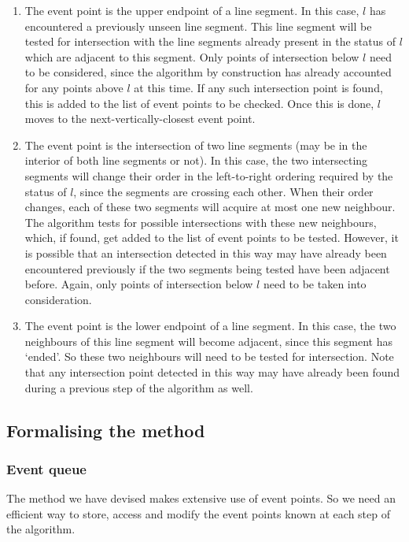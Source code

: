 \documentclass{article}
\begin{document}
\begin{enumerate}
    \item The event point is the upper endpoint of a line segment. In this case, $l$ has encountered a previously unseen line segment. This line segment will be tested for intersection with the line segments already present in the status of $l$ which are adjacent to this segment. Only points of intersection below $l$ need to be considered, since the algorithm by construction has already accounted for any points above $l$ at this time. If any such intersection point is found, this is added to the list of event points to be checked. Once this is done, $l$ moves to the next-vertically-closest event point.
    
    \item The event point is the intersection of two line segments (may be in the interior of both line segments or not). In this case, the two intersecting segments will change their order in the left-to-right ordering required by the status of $l$, since the segments are crossing each other. When their order changes, each of these two segments will acquire at most one new neighbour. The algorithm tests for possible intersections with these new neighbours, which, if found, get added to the list of event points to be tested. However, it is possible that an intersection detected in this way may have already been encountered previously if the two segments being tested have been adjacent before. Again, only points of intersection below $l$ need to be taken into consideration.
    
    \item The event point is the lower endpoint of a line segment. In this case, the two neighbours of this line segment will become adjacent, since this segment has `ended'. So these two neighbours will need to be tested for intersection. Note that any intersection point detected in this way may have already been found during a previous step of the algorithm as well.
\end{enumerate}

\subsection{Formalising the method}

\subsubsection{Event queue}

The method we have devised makes extensive use of event points. So we need an efficient way to store, access and modify the event points known at each step of the algorithm.
\end{document}
